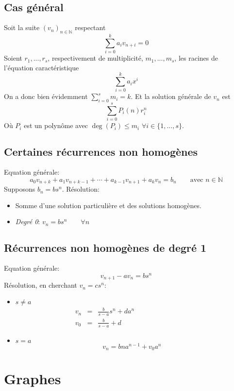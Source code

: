 \subsection{Cas général}
Soit la suite $(v_n)_{n \in \mathbb{N}}$ respectant
\[ \sum_{i = 0}^{k} a_i v_{n + i} = 0 \]
Soient $r_1, ..., r_s$, respectivement de multiplicité, $m_1, ..., m_s$, les racines de l'équation caractéristique
\[ \sum_{i = 0}^{k} a_i x^{i} \]
On a donc bien évidemment $\sum_{i = 0}^{s} m_i = k$. Et la solution générale de $v_n$ est
$$\sum_{i=0}^{s} P_i(n)r_{i}^{n}$$
Où $P_i$ est un polynôme avec $\deg(P_i) \leq m_i$ $\forall i \in \{1, ..., s\}$.

\subsection{Certaines récurrences non homogènes}
Equation générale:
\[ a_0v_{n+k} + a_1v_{n+k-1} + \cdots + a_{k-1}v_{n+1} + a_kv_n = b_n \qquad \text{avec }n \in \mathbb{N} \]
Supposons $b_n = bs^n$.
Résolution:\\
\begin{itemize}
\item Somme d'une solution particulière et des solutions homogènes.\\
\item \emph{Degré 0}: $v_n = bs^n \qquad \forall n$\\
\end{itemize}

\subsection{Récurrences non homogènes de degré 1}
Equation générale:
\[ v_{n+1} - av_n = bs^n \]
Résolution, en cherchant $v_n = cs^n$:
\begin{itemize}
  \item $s \neq a$
    \begin{eqnarray*}
      v_n &=& \frac{b}{s - a}s^n + da^n \qquad{\qquad{\qquad{\qquad}}}\\
      v_0 &=& \frac{b}{s - a} + d
    \end{eqnarray*}
  \item $s = a$ \[ v_n = bna^{n-1} + v_0a^n \]
\end{itemize}


\section{Graphes}

